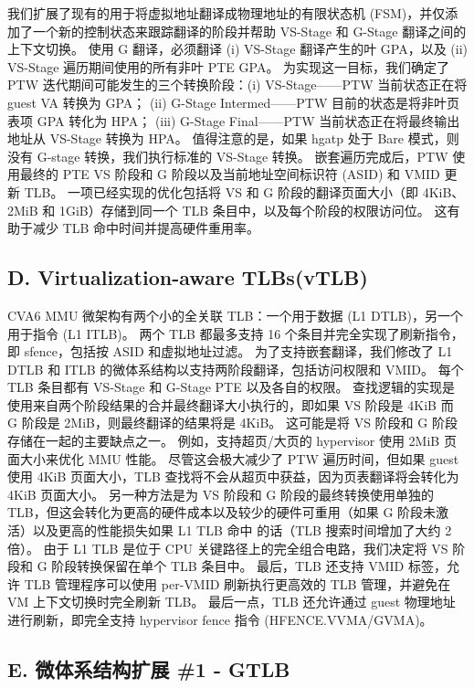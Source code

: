 我们扩展了现有的用于将虚拟地址翻译成物理地址的有限状态机 (FSM)，并仅添加了一个新的控制状态来跟踪翻译的阶段并帮助 VS-Stage 和 G-Stage 翻译之间的上下文切换。 使用 G 翻译，必须翻译 (i) VS-Stage 翻译产生的叶 GPA，以及 (ii) VS-Stage 遍历期间使用的所有非叶 PTE GPA。 为实现这一目标，我们确定了 PTW 迭代期间可能发生的三个转换阶段：(i) VS-Stage——PTW 当前状态正在将 guest VA 转换为 GPA； (ii) G-Stage Intermed——PTW 目前的状态是将非叶页表项 GPA 转化为 HPA； (iii) G-Stage Final——PTW 当前状态正在将最终输出地址从 VS-Stage 转换为 HPA。 值得注意的是，如果 hgatp 处于 Bare 模式，则没有 G-stage 转换，我们执行标准的 VS-Stage 转换。 嵌套遍历完成后，PTW 使用最终的 PTE  VS 阶段和 G 阶段以及当前地址空间标识符 (ASID) 和 VMID 更新 TLB。 一项已经实现的优化包括将 VS 和 G 阶段的翻译页面大小（即 4KiB、2MiB 和 1GiB）存储到同一个 TLB 条目中，以及每个阶段的权限访问位。 这有助于减少 TLB 命中时间并提高硬件重用率。

\subsection*{D. Virtualization-aware TLBs(vTLB)}

CVA6 MMU 微架构有两个小的全关联 TLB：一个用于数据 (L1 DTLB)，另一个用于指令 (L1 ITLB)。 两个 TLB 都最多支持 16 个条目并完全实现了刷新指令，即 sfence，包括按 ASID 和虚拟地址过滤。 为了支持嵌套翻译，我们修改了 L1 DTLB 和 ITLB 的微体系结构以支持两阶段翻译，包括访问权限和 VMID。 每个 TLB 条目都有 VS-Stage 和 G-Stage PTE 以及各自的权限。 查找逻辑的实现是使用来自两个阶段结果的合并最终翻译大小执行的，即如果 VS 阶段是 4KiB 而 G 阶段是 2MiB，则最终翻译的结果将是 4KiB。 这可能是将 VS 阶段和 G 阶段存储在一起的主要缺点之一。 例如，支持超页/大页的 hypervisor 使用 2MiB 页面大小来优化 MMU 性能。 尽管这会极大减少了 PTW 遍历时间，但如果 guest 使用 4KiB 页面大小，TLB 查找将不会从超页中获益，因为页表翻译将会转化为 4KiB 页面大小。 另一种方法是为 VS 阶段和 G 阶段的最终转换使用单独的 TLB，但这会转化为更高的硬件成本以及较少的硬件可重用（如果 G 阶段未激活）以及更高的性能损失如果 L1 TLB 命中 的话（TLB 搜索时间增加了大约 2 倍）。 由于 L1 TLB 是位于 CPU 关键路径上的完全组合电路，我们决定将 VS 阶段和 G 阶段转换保留在单个 TLB 条目中。 最后，TLB 还支持 VMID 标签，允许 TLB 管理程序可以使用 per-VMID 刷新执行更高效的 TLB 管理，并避免在 VM 上下文切换时完全刷新 TLB。 最后一点，TLB 还允许通过 guest 物理地址进行刷新，即完全支持 hypervisor fence 指令 (HFENCE.VVMA/GVMA)。

\subsection*{E. 微体系结构扩展 \#1 - GTLB}


